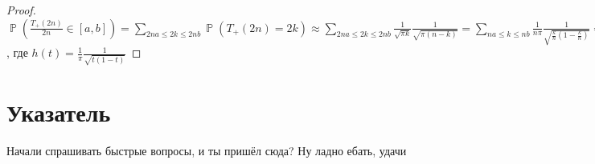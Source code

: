 \documentclass[a4paper,100pt]{article}
\theoremstyle{indented}
\theoremstyle{definition}
\theoremstyle{remark}
\DeclareMathOperator{\PP}{\mathbb{P}}
\begin{document}
\begin{proof}
  $\PP(\frac{T_+(2n)}{2n} \in [a, b])=\sum_{2na \leq 2k \leq 2nb} \PP(T_+(2n)=2k) \approx \sum_{2na \leq 2k \leq 2nb} \frac{1}{\sqrt{\pi k}} \frac{1}{\sqrt{\pi (n-k)}}=\sum_{na \leq k \leq nb} \frac{1}{n \pi} \frac{1}{\sqrt{\frac{k}{n}(1-\frac{k}{n})}}=\sum_{a \leq \frac{k}{n} \leq b} \frac{1}{n} h(\frac{k}{n}) \approx \int_a^bh(x) dx=\frac{2}{\pi} \Big ( \arcsin{\sqrt{b}} - \arcsin{\sqrt{a}} \Big )$, где $h(t)=\frac{1}{\pi}\frac{1}{\sqrt{t(1-t)}}$
\end{proof}












\newpage

\section{Указатель}

\hypertarget{t2}{Начали спрашивать быстрые вопросы, и ты пришёл сюда? Ну ладно ебать, удачи}
\end{document}
